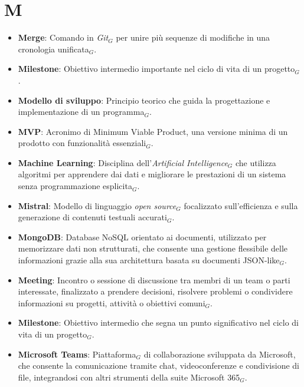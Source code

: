 \section{M}
\begin{itemize}
    \item \textbf{Merge}: Comando in \textit{Git}$_G$ per unire più sequenze di modifiche in una cronologia unificata$_G$.
    \item \textbf{Milestone}: Obiettivo intermedio importante nel ciclo di vita di un progetto$_G$.
    \item \textbf{Modello di sviluppo}: Principio teorico che guida la progettazione e implementazione di un programma$_G$.
    \item \textbf{MVP}: Acronimo di Minimum Viable Product, una versione minima di un prodotto con funzionalità essenziali$_G$.
    \item \textbf{Machine Learning}: Disciplina dell'\textit{Artificial Intelligence}$_G$ che utilizza algoritmi per apprendere dai dati e migliorare le prestazioni di un sistema senza programmazione esplicita$_G$.
    \item \textbf{Mistral}: Modello di linguaggio \textit{open source}$_G$ focalizzato sull'efficienza e sulla generazione di contenuti testuali accurati$_G$.
    \item \textbf{MongoDB}: Database NoSQL orientato ai documenti, utilizzato per memorizzare dati non strutturati, che consente una gestione flessibile delle informazioni grazie alla sua architettura basata su documenti JSON-like$_G$.
    \item \textbf{Meeting}: Incontro o sessione di discussione tra membri di un team o parti interessate, finalizzato a prendere decisioni, risolvere problemi o condividere informazioni su progetti, attività o obiettivi comuni$_G$.
    \item \textbf{Milestone}: Obiettivo intermedio che segna un punto significativo nel ciclo di vita di un progetto$_G$.
    \item \textbf{Microsoft Teams}: Piattaforma$_G$ di collaborazione sviluppata da Microsoft, che consente la comunicazione tramite chat, videoconferenze e condivisione di file, integrandosi con altri strumenti della suite Microsoft 365$_G$.
\end{itemize}
